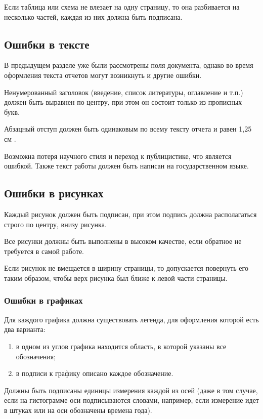 Если таблица или схема не влезает на одну страницу, то она разбивается на несколько частей, каждая из них должна быть подписана.

\subsection{Ошибки в тексте}
В предыдущем разделе уже были рассмотрены поля документа, однако во время оформления текста отчетов могут возникнуть и другие ошибки.

Ненумерованный заголовок (введение, список литературы, оглавление и т.п.) должен быть выравнен по центру, при этом он состоит только из прописных букв.

Абзацный отступ должен быть одинаковым по всему тексту отчета и равен 1,25 см \cite{GOST732}.

Возможна потеря научного стиля и переход к публицистике, что является ошибкой. Также текст работы должен быть написан на государственном языке.

\subsection{Ошибки в рисунках}
Каждый рисунок должен быть подписан, при этом подпись должна располагаться строго по центру, внизу рисунка.

Все рисунки должны быть выполнены в высоком качестве, если обратное не требуется в самой работе.

Если рисунок не вмещается в ширину страницы, то допускается повернуть его таким образом, чтобы верх рисунка был ближе к левой части страницы.

\subsubsection{Ошибки в графиках}
Для каждого графика должна существовать легенда, для оформления которой есть два варианта:
\begin{enumerate}
	\item в одном из углов графика находится область, в которой указаны все обозначения;
	\item в подписи к графику описано каждое обозначение.
\end{enumerate}

Должны быть подписаны единицы измерения каждой из осей (даже в том случае, если на гистограмме оси подписываются словами, например, если измерение идет в штуках или на оси обозначены времена года).


